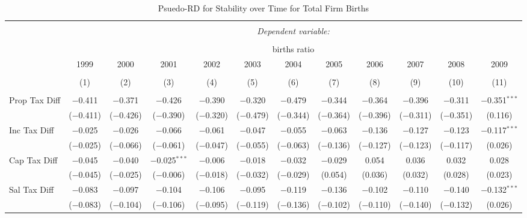 \documentclass[12pt,a4paper]{article}
\begin{document}
\begin{landscape}

\begin{table}[!htbp] \centering 
  \caption{Psuedo-RD for Stability over Time for  Total Firm Births} 
  \label{--year} 
\small 
\begin{tabular}{@{\extracolsep{5pt}}lccccccccccc} 
\\[-1.8ex]\hline 
\hline \\[-1.8ex] 
 & \multicolumn{11}{c}{\textit{Dependent variable:}} \\ 
\cline{2-12} 
\\[-1.8ex] & \multicolumn{11}{c}{births ratio} \\ 
 & 1999 & 2000 & 2001 & 2002 & 2003 & 2004 & 2005 & 2006 & 2007 & 2008 & 2009 \\ 
\\[-1.8ex] & (1) & (2) & (3) & (4) & (5) & (6) & (7) & (8) & (9) & (10) & (11)\\ 
\hline \\[-1.8ex] 
 Prop Tax Diff & $-$0.411 & $-$0.371 & $-$0.426 & $-$0.390 & $-$0.320 & $-$0.479 & $-$0.344 & $-$0.364 & $-$0.396 & $-$0.311 & $-$0.351$^{***}$ \\ 
  & ($-$0.411) & ($-$0.426) & ($-$0.390) & ($-$0.320) & ($-$0.479) & ($-$0.344) & ($-$0.364) & ($-$0.396) & ($-$0.311) & ($-$0.351) & (0.116) \\ 
  Inc Tax Diff & $-$0.025 & $-$0.026 & $-$0.066 & $-$0.061 & $-$0.047 & $-$0.055 & $-$0.063 & $-$0.136 & $-$0.127 & $-$0.123 & $-$0.117$^{***}$ \\ 
  & ($-$0.025) & ($-$0.066) & ($-$0.061) & ($-$0.047) & ($-$0.055) & ($-$0.063) & ($-$0.136) & ($-$0.127) & ($-$0.123) & ($-$0.117) & (0.026) \\ 
  Cap Tax Diff & $-$0.045 & $-$0.040 & $-$0.025$^{***}$ & $-$0.006 & $-$0.018 & $-$0.032 & $-$0.029 & 0.054 & 0.036 & 0.032 & 0.028 \\ 
  & ($-$0.045) & ($-$0.025) & ($-$0.006) & ($-$0.018) & ($-$0.032) & ($-$0.029) & (0.054) & (0.036) & (0.032) & (0.028) & (0.023) \\ 
  Sal Tax Diff & $-$0.083 & $-$0.097 & $-$0.104 & $-$0.106 & $-$0.095 & $-$0.119 & $-$0.136 & $-$0.102 & $-$0.110 & $-$0.140 & $-$0.132$^{***}$ \\ 
  & ($-$0.083) & ($-$0.104) & ($-$0.106) & ($-$0.095) & ($-$0.119) & ($-$0.136) & ($-$0.102) & ($-$0.110) & ($-$0.140) & ($-$0.132) & (0.026) \\ 

\end{tabular}
\end{table}
\end{landscape}
\end{document}

